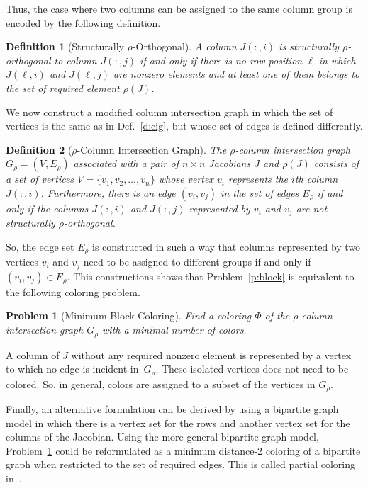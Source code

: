 \documentclass[12pt, oneside]{book}
\newtheorem{problem}{Problem}
\newtheorem{definition}{Definition}
\newcommand{\sparsifysymbol}{\ensuremath{\rho}}
\newcommand{\sparsify}[1]{\ensuremath{\sparsifysymbol(#1)}}
\begin{document}
Thus, the case where two columns can be assigned to the same column group is encoded by
the following definition.

\begin{definition}[Structurally $\sparsifysymbol$-Orthogonal]
A column $J(:,i)$ is structurally $\sparsifysymbol$-orthogonal to column $J(:,j)$ if and
only if there is no row position $\ell$ in which $J(\ell,i)$ and $J(\ell,j)$ are nonzero
elements and at least one of them belongs to the set of required element \sparsify{J}.
\end{definition}

We now construct a modified column intersection graph in which the set of vertices is the
same as in Def.~\ref{d:cig}, but whose set of edges is defined differently.
%
\begin{definition}[$\sparsifysymbol$-Column Intersection Graph]
The $\sparsifysymbol$-column intersection graph $G_\sparsifysymbol =
(V,E_\sparsifysymbol)$ associated with a pair of $n \times n$ Jacobians $J$ and
\sparsify{J} consists of a set of vertices $V=\{v_1, v_2, \dots, v_n\}$ whose vertex
$v_i$ represents the $i$th column $J(:,i)$. Furthermore, there is an edge $(v_i,v_j)$ in
the set of edges $E_\sparsifysymbol$ if and only if the columns $J(:,i)$ and $J(:,j)$
represented by $v_i$ and $v_j$ are not structurally $\sparsifysymbol$-orthogonal.
\end{definition}

So, the edge set $E_\sparsifysymbol$ is constructed in such a way that columns
represented by two vertices $v_i$ and $v_j$ need to be assigned to different groups if
and only if $(v_i, v_j) \in E_\sparsifysymbol$. This constructions shows that
Problem~\ref{p:block} is equivalent to the following coloring problem.
%
\begin{problem}[Minimum Block Coloring]
\label{p:minblockcol}
%
Find a coloring $\Phi$ of the $\sparsifysymbol$-column intersection graph
$G_\sparsifysymbol$ with a minimal number of colors.
\end{problem}

A column of $J$ without any required nonzero element is represented by a vertex to which
no edge is incident in~$G_\sparsifysymbol$. These isolated vertices does not need to be
colored. So, in general, colors are assigned to a subset of the vertices in
$G_\sparsifysymbol$.

Finally, an alternative formulation can be derived by using a bipartite graph model in
which there is a vertex set for the rows and another vertex set for the columns of the
Jacobian. Using the more general bipartite graph model, Problem~\ref{p:minblockcol} could
be reformulated as a minimum distance-2 coloring of a bipartite graph when restricted to
the set of required edges. This is called partial coloring in~\cite{Gebremedhin05whatcolor}.
\end{document}
